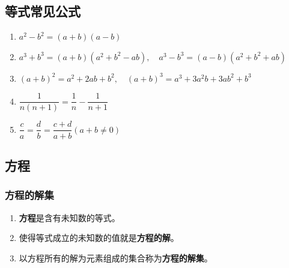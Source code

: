 \subsection*{等式常见公式}
\begin{enumerate}
    \item $a^2 - b^2 = (a+b)(a-b)$
    \item $a^3+b^3 = (a+b)(a^2+b^2-ab), \quad a^3 - b^3 = (a-b)(a^2+b^2+ab)$
    \item $(a+b)^2 = a^2 + 2ab + b^2, \quad (a+b)^3 = a^3 + 3a^2b + 3ab^2 + b^3$
    \item $\dfrac{1}{n(n+1)} = \dfrac{1}{n} - \dfrac{1}{n+1}$
    \item $\dfrac{c}{a} = \dfrac{d}{b} = \dfrac{c+d}{a+b} (a+b \neq 0)$
\end{enumerate}
\subsection*{方程}
\subsubsection*{方程的解集}
\begin{enumerate}
    \item \textbf{方程}是含有未知数的等式。
    \item 使得等式成立的未知数的值就是\textbf{方程的解}。
    \item 以方程所有的解为元素组成的集合称为\textbf{方程的解集}。
\end{enumerate}
